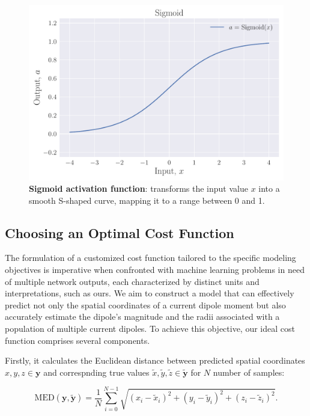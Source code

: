 \documentclass[a4paper, UKenglish, 11pt]{uiomaster}
\begin{document}
\begin{figure}
    \centering
    \includegraphics[width=\linewidth]{figures/Sigmoid.pdf}
    \caption{\textbf{Sigmoid activation function}: transforms the input value $x$ into a smooth S-shaped curve, mapping it to a range between 0 and 1.}
    \label{fig:sigmoid}
\end{figure}


\subsection{Choosing an Optimal Cost Function}
The formulation of a customized cost function tailored to the specific modeling objectives is imperative when confronted with machine learning problems in need of multiple network outputs, each characterized by distinct units and interpretations, such as ours.  We aim to construct a model that can effectively predict not only the spatial coordinates of a current dipole moment but also accurately estimate the dipole's magnitude and the radii associated with a population of multiple current dipoles. To achieve this objective, our ideal cost function comprises several components.

Firstly, it calculates the Euclidean distance between predicted spatial coordinates $x, y, z \in \mathbf{y}$ and correspnding true values $\tilde{x}, \tilde{y}, \tilde{z} \in \mathbf{\tilde{y}}$ for $N$ number of samples:

\begin{equation}
    \text{MED}(\mathbf{y}, \mathbf{\tilde{y}}) = \frac{1}{N}\sum_{i=0}^{N-1}\sqrt{(x_{i} - \tilde{x}_{i})^2 + (y_{i} - \tilde{y}_{i})^2 + (z_{i} - \tilde{z}_{i})^2}.
\label{eq:MED}
\end{equation}
\end{document}
